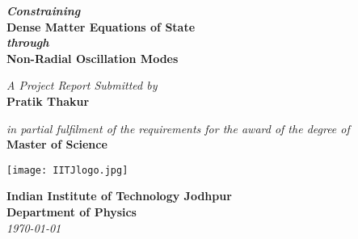 \documentclass[a4paper,12pt,onehalfspacing]{report}
\newcommand{\ttitle}{Constraining Dense Matter Equations of State through Non-Radial Oscillation Modes}
\newcommand{\degree}{Master of Science}
\newcommand{\authorname}{Pratik Thakur}
\newcommand{\deptname}{Department of Physics}
\begin{document}
\begin{titlepage}
    \begin{center}
    \begin{flushright}
    \Huge{\textbf{\emph{Constraining}\\Dense Matter Equations of State\\\emph{through}\\Non-Radial Oscillation Modes}}
    \end{flushright}
    \vfill
    \begin{flushright}
    \large{\emph{A Project Report Submitted by}}\\
    \huge{\textbf{\authorname}}
    \end{flushright}
    \vfill
    \begin{flushright}
    \large{{\emph{in partial fulfilment of the requirements for the award of the degree of}}}\\
    \huge{\textbf{\degree}}
    \end{flushright}
    \vfill
    \texttt{[image: IITJlogo.jpg]}
    \begin{flushright}
    \Large{\textbf{Indian Institute of Technology Jodhpur}}\\
    \Large{\textbf{\deptname}}\\
    \Large{\emph{\monthyeardate\today}}
    \end{flushright} 
    \end{center}
\end{titlepage}
\end{document}
